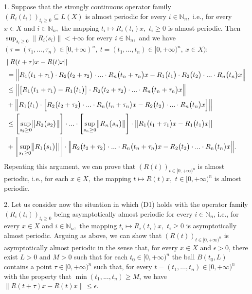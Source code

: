 \documentclass{amsart}
\theoremstyle{definition}
\theoremstyle{remark}
\numberwithin{equation}{section}
\begin{document}
1. Suppose that  the strongly continuous operator family $(R_{i}(t_{i}))_{t_{i}\geq 0}\subseteq L(X)$ is almost periodic for every $i\in {\mathbb N}_{n} ,$ i.e., for every $x\in X $ and $i\in {\mathbb N}_{n} ,$ the mapping $t_{i}\mapsto R_{i}(t_{i})x,$ $t_{i}\geq 0$ is almost periodic.
Then $\sup_{s_{i}\geq 0}\bigl\| R_{i}\bigl(s_{i}\bigr)\bigr\|<+\infty$ for every $i\in {\mathbb N}_{n} ,$ and  we have $(\tau =(\tau_{1},...,\tau_{n})\in [0,+\infty)^{n},\  t=(t_{1},...,t_{n})\in [0,+\infty)^{n},\ x\in X)
:$
\begin{align*}&
\| R(t+\tau)x-R(t)x\| 
\\& =\Bigl\|R_{1}\bigl(t_{1}+\tau_{1}\bigr)\cdot R_{2}\bigl(t_{2}+\tau_{2}\bigr)\cdot ...\cdot R_{n}\bigl(t_{n}+\tau_{n}\bigr)x-  R_{1}\bigl(t_{1}\bigr)\cdot R_{2}\bigl(t_{2}\bigr) \cdot...\cdot R_{n}\bigl(t_{n}\bigr)x\Bigr\|
\\& \leq \Bigl\| \bigl[ R_{1}\bigl(t_{1}+\tau_{1}\bigr)-R_{1}\bigl(t_{1}\bigr)\bigr] \cdot R_{2}\bigl(t_{2}+\tau_{2}\bigr)\cdot ...\cdot R_{n}\bigl(t_{n}+\tau_{n}\bigr)x\Bigr\|
\\&+ \Bigl\| R_{1}\bigl(t_{1}\bigr) \cdot \Bigl[ R_{2}\bigl(t_{2}+\tau_{2}\bigr)\cdot ...\cdot R_{n}\bigl(t_{n}+\tau_{n}\bigr)x-R_{2}\bigl(t_{2}\bigr)\cdot ...\cdot R_{n}\bigl(t_{n}\bigr)x \Bigr]\Bigr\|
\\& \leq \Biggl[\sup_{s_{2}\geq 0}\bigl\| R_{2}\bigl(s_{2}\bigr)\bigr\| \Biggr] \cdot ... \cdot \Biggl[\sup_{s_{n}\geq 0}\bigl\| R_{n}\bigl(s_{n}\bigr)\bigr\| \Biggr]  \cdot \bigl\| R_{1}\bigl(t_{1}+\tau_{1}\bigr)x-R_{1}\bigl(t_{1}\bigr)x\bigr\|
\\& +\Biggl[\sup_{s_{1}\geq 0}\bigl\| R_{1}\bigl(s_{1}\bigr)\bigr\| \Biggr] \cdot \Bigl\| R_{2}\bigl(t_{2}+\tau_{2}\bigr)\cdot ...\cdot R_{n}\bigl(t_{n}+\tau_{n}\bigr)x-R_{2}\bigl(t_{2}\bigr)\cdot ...\cdot R_{n}\bigl(t_{n}\bigr)x \Bigr\|.
\end{align*}Repeating this argument, we can prove that $(R(t))_{t\in [0,+\infty)^{n}}$ is almost periodic, i.e., for each $x\in X,$ the mapping $t\mapsto R(t)x,$ $t\in [0,+\infty)^{n}$ is almost periodic.

2. Let us consider now the situation in which (D1) holds with the operator family $(R_{i}(t_{i}))_{t_{i}\geq 0}$ being asymptotically almost periodic for every $i\in {\mathbb N}_{n} $, i.e., for every $x\in X$ and $i\in {\mathbb N}_{n} ,$ the mapping $t_{i}\mapsto R_{i}(t_{i})x,$ $t_{i}\geq 0$ is asymptotically almost periodic. Arguing as above, we can show that $(R(t))_{t\in [0,+\infty)^{n}}$ is asymptotically almost periodic in the sense that, for every $x\in X$ and $\epsilon>0$, there exist $L>0$ and $M>0$ such that for each $t_{0}\in [0,+\infty)^{n}$ the ball $B(t_{0},L)$ contains a point $\tau \in  [0,+\infty)^{n}$ such that, for every $t=(t_{1},...,t_{n})\in [0,+\infty)^{n}$ with the property that $\min(t_{1},...,t_{n})\geq M$, we have $\|R(t+\tau)x-R(t)x\| \leq \epsilon.$
\end{document}

